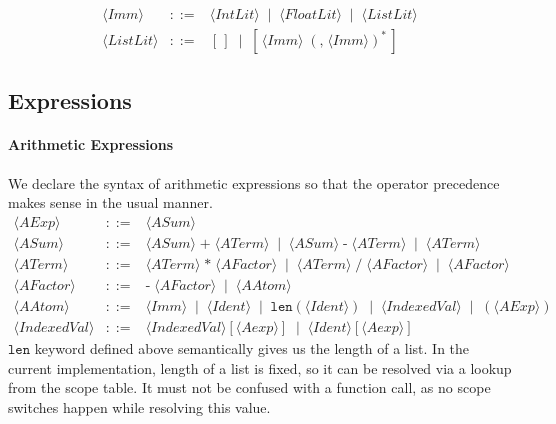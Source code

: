 \documentclass{article}
\begin{document}
\[
\begin{array}{rcl}
\langle \mathit{Imm} \rangle
&::=&
\langle \mathit{IntLit} \rangle
\;\mid\;
\langle \mathit{FloatLit} \rangle
\;\mid\;
\langle \mathit{ListLit} \rangle \\[4pt]

\langle \mathit{ListLit} \rangle
&::=&
[\,]
\;\mid\;
[\,\langle \mathit{Imm} \rangle\;(\texttt{,}\;\langle \mathit{Imm} \rangle)^*\,]
\end{array}
\]

\subsection{Expressions}

\paragraph{Arithmetic Expressions} 
We declare the syntax of arithmetic expressions so that the operator precedence makes sense in the usual manner.
\[
\begin{array}{rcl}
\langle \mathit{AExp} \rangle
&::=&
\langle \mathit{ASum} \rangle \\[4pt]

\langle \mathit{ASum} \rangle
&::=&
\langle \mathit{ASum} \rangle\;\texttt{+}\;\langle \mathit{ATerm} \rangle
\;\mid\;
\langle \mathit{ASum} \rangle\;\texttt{-}\;\langle \mathit{ATerm} \rangle
\;\mid\;
\langle \mathit{ATerm} \rangle \\[4pt]

\langle \mathit{ATerm} \rangle
&::=&
\langle \mathit{ATerm} \rangle\;\texttt{*}\;\langle \mathit{AFactor} \rangle
\;\mid\;
\langle \mathit{ATerm} \rangle\;\texttt{/}\;\langle \mathit{AFactor} \rangle
\;\mid\;
\langle \mathit{AFactor} \rangle \\[4pt]

\langle \mathit{AFactor} \rangle
&::=&
\texttt{-}\;\langle \mathit{AFactor} \rangle
\;\mid\;
\langle \mathit{AAtom} \rangle \\[4pt]

\langle \mathit{AAtom} \rangle
&::=&
\langle \mathit{Imm} \rangle
\;\mid\;
\langle \mathit{Ident} \rangle
\;\mid\;
\mathtt{len}(\langle \mathit{Ident} \rangle)
\;\mid\;
\langle \mathit{IndexedVal} \rangle
\;\mid\;
(\langle \mathit{AExp} \rangle) \\[4pt]

\langle \mathit{IndexedVal} \rangle
&::=&
\langle \mathit{IndexedVal} \rangle [\langle \mathit{Aexp} \rangle]
\;\mid\;
\langle \mathit{Ident} \rangle [\langle \mathit{Aexp} \rangle]
\end{array}
\]
$\mathtt{len}$ keyword defined above semantically gives us the length of a list. In the current implementation, length of a list is fixed, so it can be resolved via a lookup from the scope table. It must not be confused with a function call, as no scope switches happen while resolving this value.
\end{document}
